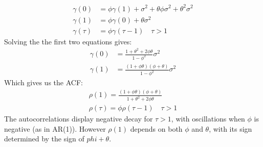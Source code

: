 \documentclass[DIV=14,titlepage=false]{scrreprt}
\begin{document}
\begin{example}[ARMA(1,1)]
\begin{align*}
    \gamma(0) &= \phi \gamma(1) + \sigma^2 + \theta \phi \sigma^2 + \theta^2 \sigma^2 \\
    \gamma(1) &= \phi \gamma(0) + \theta \sigma^2 \\
    \gamma(\tau) &= \phi \gamma(\tau-1) \quad \tau > 1
\end{align*}
Solving the the first two equations gives:
\begin{align*}
    \gamma(0) &= \frac{1+\theta^2 + 2 \phi \theta}{1-\phi^2} \sigma^2 \\
    \gamma(1) &= \frac{(1+ \phi \theta)(\phi + \theta)}{1-\phi^2} \sigma^2
\end{align*}
Which gives us the ACF:
\begin{align*}
    \rho(1) = \frac{(1+ \phi \theta)(\phi + \theta)}{1+\theta^2 + 2 \phi \theta}\\
    \rho(\tau) = \phi \rho(\tau-1) \quad \tau > 1
\end{align*}
    The autocorrelations display negative decay for $\tau > 1$, with oscillations when $\phi$ is negative (as in AR(1)). However $\rho(1)$ depends on both $\phi$ and $\theta$, with its sign determined by the sign of $phi + \theta$.
\end {example}
\end{document}
